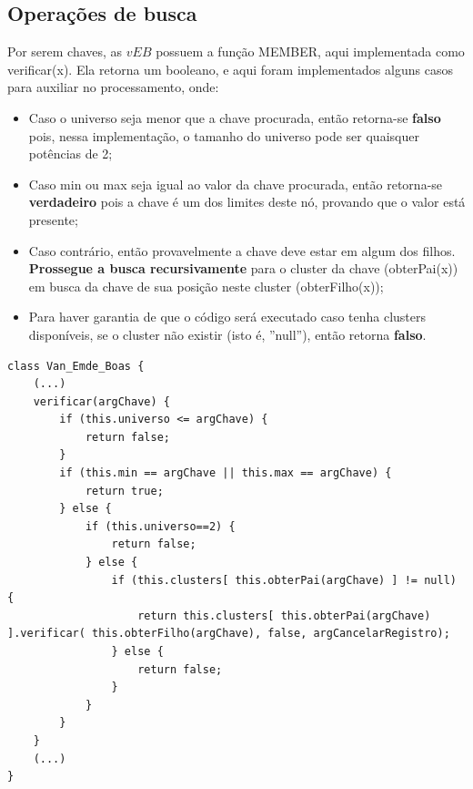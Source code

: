 \documentclass[12pt]{article}
\begin{document}
\subsection{Operações de busca}
Por serem chaves, as $vEB$ possuem a função MEMBER, aqui implementada como verificar(x). Ela retorna um booleano, e aqui foram implementados alguns casos para auxiliar no processamento, onde:
\begin{itemize}
    \item Caso o universo seja menor que a chave procurada, então retorna-se \textbf{falso} pois, nessa implementação, o tamanho do universo pode ser quaisquer potências de 2;
    \item Caso min ou max seja igual ao valor da chave procurada, então retorna-se \textbf{verdadeiro} pois a chave é um dos limites deste nó, provando que o valor está presente;
    \item Caso contrário, então provavelmente a chave deve estar em algum dos filhos. \textbf{Prossegue a busca recursivamente} para o cluster da chave (obterPai(x)) em busca da chave de sua posição neste cluster (obterFilho(x));
    \item Para haver garantia de que o código será executado caso tenha clusters disponíveis, se o cluster não existir (isto é, ''null''), então retorna \textbf{falso}.
\end{itemize}

\begin{verbatim}
class Van_Emde_Boas {
    (...)
    verificar(argChave) {
        if (this.universo <= argChave) {
            return false;
        }
        if (this.min == argChave || this.max == argChave) {
            return true;
        } else {
            if (this.universo==2) {
                return false;
            } else {
                if (this.clusters[ this.obterPai(argChave) ] != null) {
                    return this.clusters[ this.obterPai(argChave) ].verificar( this.obterFilho(argChave), false, argCancelarRegistro);
                } else {
                    return false;
                }
            }
        }
    }
    (...)
}
\end{verbatim}
\end{document}
